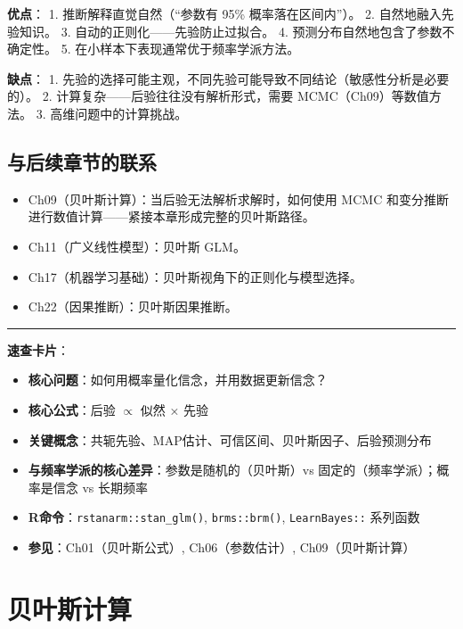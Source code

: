\documentclass[
]{book}
\providecommand{\tightlist}{%
  \setlength{\itemsep}{0pt}\setlength{\parskip}{0pt}}
\begin{document}
\textbf{优点}：
1. 推断解释直觉自然（``参数有 95\% 概率落在区间内''）。
2. 自然地融入先验知识。
3. 自动的正则化------先验防止过拟合。
4. 预测分布自然地包含了参数不确定性。
5. 在小样本下表现通常优于频率学派方法。

\textbf{缺点}：
1. 先验的选择可能主观，不同先验可能导致不同结论（敏感性分析是必要的）。
2. 计算复杂------后验往往没有解析形式，需要 MCMC（Ch09）等数值方法。
3. 高维问题中的计算挑战。

\section{与后续章节的联系}\label{ux4e0eux540eux7eedux7ae0ux8282ux7684ux8054ux7cfb}

\begin{itemize}
\tightlist
\item
  Ch09（贝叶斯计算）：当后验无法解析求解时，如何使用 MCMC 和变分推断进行数值计算------紧接本章形成完整的贝叶斯路径。
\item
  Ch11（广义线性模型）：贝叶斯 GLM。
\item
  Ch17（机器学习基础）：贝叶斯视角下的正则化与模型选择。
\item
  Ch22（因果推断）：贝叶斯因果推断。
\end{itemize}

\begin{center}\rule{0.5\linewidth}{0.5pt}\end{center}

\textbf{速查卡片}：

\begin{itemize}
\tightlist
\item
  \textbf{核心问题}：如何用概率量化信念，并用数据更新信念？
\item
  \textbf{核心公式}：后验 \(\propto\) 似然 × 先验
\item
  \textbf{关键概念}：共轭先验、MAP估计、可信区间、贝叶斯因子、后验预测分布
\item
  \textbf{与频率学派的核心差异}：参数是随机的（贝叶斯）vs 固定的（频率学派）；概率是信念 vs 长期频率
\item
  \textbf{R命令}：\texttt{rstanarm::stan\_glm()}, \texttt{brms::brm()}, \texttt{LearnBayes::} 系列函数
\item
  \textbf{参见}：Ch01（贝叶斯公式）, Ch06（参数估计）, Ch09（贝叶斯计算）
\end{itemize}

\chapter{贝叶斯计算}\label{ux8d1dux53f6ux65afux8ba1ux7b97}
\end{document}
